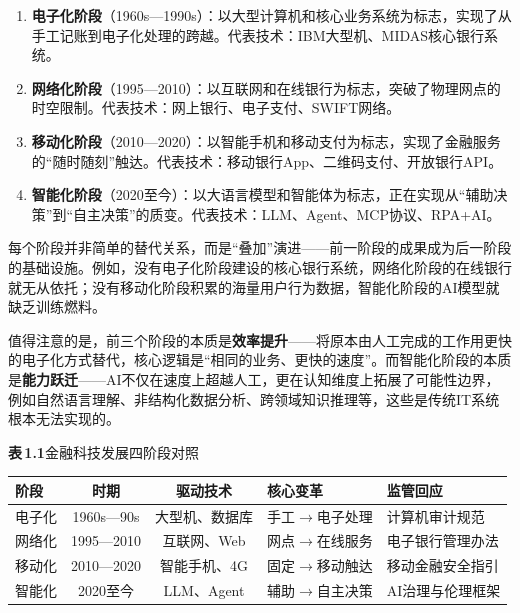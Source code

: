 \begin{theorybox}[金融科技四阶段模型]
\begin{enumerate}[leftmargin=1.5em]
  \item \textbf{电子化阶段}（1960s—1990s）：以大型计算机和核心业务系统为标志，实现了从手工记账到电子化处理的跨越。代表技术：IBM大型机、MIDAS核心银行系统。
  \item \textbf{网络化阶段}（1995—2010）：以互联网和在线银行为标志，突破了物理网点的时空限制。代表技术：网上银行、电子支付、SWIFT网络。
  \item \textbf{移动化阶段}（2010—2020）：以智能手机和移动支付为标志，实现了金融服务的``随时随刻''触达。代表技术：移动银行App、二维码支付、开放银行API。
  \item \textbf{智能化阶段}（2020至今）：以大语言模型和智能体为标志，正在实现从``辅助决策''到``自主决策''的质变。代表技术：LLM、Agent、MCP协议、RPA+AI。
\end{enumerate}
\end{theorybox}

每个阶段并非简单的替代关系，而是``叠加''演进——前一阶段的成果成为后一阶段的基础设施。例如，没有电子化阶段建设的核心银行系统，网络化阶段的在线银行就无从依托；没有移动化阶段积累的海量用户行为数据，智能化阶段的AI模型就缺乏训练燃料。

值得注意的是，前三个阶段的本质是\textbf{效率提升}——将原本由人工完成的工作用更快的电子化方式替代，核心逻辑是``相同的业务、更快的速度''。而智能化阶段的本质是\textbf{能力跃迁}——AI不仅在速度上超越人工，更在认知维度上拓展了可能性边界，例如自然语言理解、非结构化数据分析、跨领域知识推理等，这些是传统IT系统根本无法实现的。

\vspace{1em}

\noindent\textbf{表\,1.1}\quad 金融科技发展四阶段对照

\vspace{0.5em}

\begin{tabularx}{\textwidth}{l c c X X}
\toprule
\textbf{阶段} & \textbf{时期} & \textbf{驱动技术} & \textbf{核心变革} & \textbf{监管回应} \\
\midrule
电子化 & 1960s—90s & 大型机、数据库 & 手工$\rightarrow$电子处理 & 计算机审计规范 \\
网络化 & 1995—2010 & 互联网、Web & 网点$\rightarrow$在线服务 & 电子银行管理办法 \\
移动化 & 2010—2020 & 智能手机、4G & 固定$\rightarrow$移动触达 & 移动金融安全指引 \\
智能化 & 2020至今 & LLM、Agent & 辅助$\rightarrow$自主决策 & AI治理与伦理框架 \\
\bottomrule
\end{tabularx}

